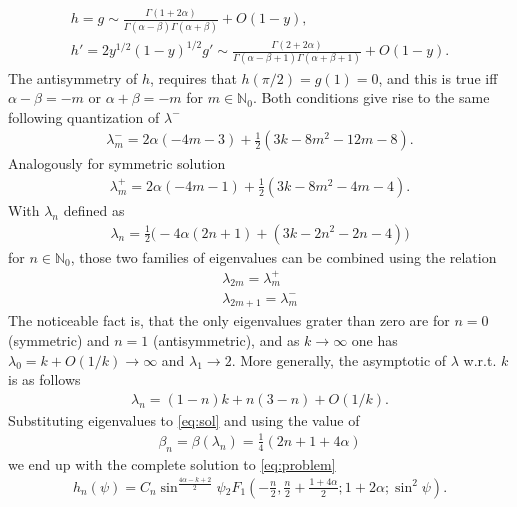 \documentclass[
a4paper,%
10pt,%
titlepage,%
twoside%
]{article}
\begin{document}
\begin{gather}
  h=g\sim\frac{\Gamma(1+2\alpha)}{\Gamma(\alpha-\beta)\Gamma(\alpha+\beta)}+O(1-y),\\
  h'=2y^{1/2}(1-y)^{1/2}g'\sim\frac{\Gamma(2+2\alpha)}{\Gamma(\alpha-\beta+1)\Gamma(\alpha+\beta+1)}+O(1-y).
\end{gather}
The antisymmetry of $h$, requires that $h(\pi/2)=g(1)=0$, and this is true
iff $\alpha-\beta=-m$ or $\alpha+\beta=-m$ for
$m\in\mathbb{N}_0$. Both conditions give rise to the same following
quantization of $\lambda^-$
\begin{gather}
  \lambda^-_m=2\alpha (-4 m-3)+\frac{1}{2}(3 k-8
  m^2-12 m-8).
\end{gather}
Analogously for symmetric solution
\begin{gather}
  \lambda^+_m=2\alpha(-4 m-1)+\frac{1}{2} (3 k-8
  m^2-4 m-4).
\end{gather}
With $\lambda_n$ defined as
\begin{gather}
  \lambda_n=\frac{1}{2}\big(-4\alpha(2n+1)+
  (3k-2n^2-2n-4)\big)
\end{gather}
for $n\in\mathbb{N}_0$, those two families of eigenvalues can be combined
using the relation
\begin{gather}
  \lambda_{2m}=\lambda_m^+\\
  \lambda_{2m+1}=\lambda_m^-
\end{gather}
The noticeable fact is, that the only eigenvalues grater than zero are
for $n=0$ (symmetric) and $n=1$ (antisymmetric), and as
$k\rightarrow\infty$ one has $\lambda_0= k + O(1/k)\rightarrow\infty$
and $\lambda_1\rightarrow 2$. More generally, the asymptotic of
$\lambda$ w.r.t. $k$ is as follows
\begin{gather}
  \lambda_n=(1-n)k+n(3-n)+O(1/k).
\end{gather}
Substituting eigenvalues to \eqref{eq:sol} and using the value of
\begin{gather}
  \beta_n=\beta(\lambda_n)=\frac{1}{4}(2n+1+4\alpha)
\end{gather}
we end up with the complete solution to \eqref{eq:problem}
\begin{gather}
  h_n(\psi)=C_n\sin^{\frac{4\alpha-k+2}{2}}\psi {}_2 F_1 (-\frac{n}{2},\frac{n}{2}+\frac{1+4\alpha}{2};1+2\alpha;\sin^2\psi).
\end{gather}
\end{document}
